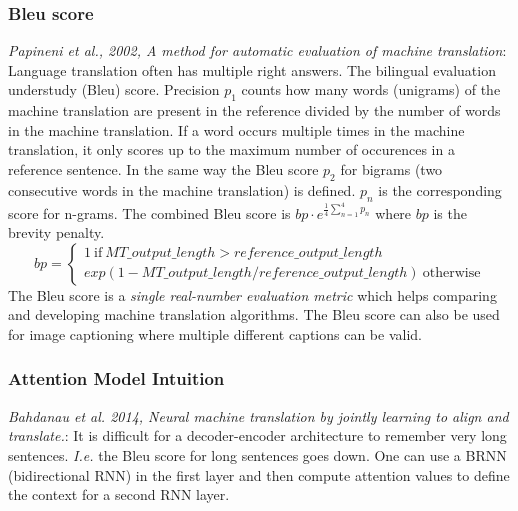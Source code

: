 \documentclass{article}
\begin{document}
\subsubsection{Bleu score}
\emph{Papineni et al., 2002, A method for automatic evaluation of machine translation}:
Language translation often has multiple right answers.
The bilingual evaluation understudy (Bleu) score.
Precision $p_1$ counts how many words (unigrams) of the machine translation are present in the reference
divided by the number of words in the machine translation.
If a word occurs multiple times in the machine translation, it only scores up to the maximum number of occurences in a reference sentence.
In the same way the Bleu score $p_2$ for bigrams (two consecutive words in the machine translation) is defined.
$p_n$ is the corresponding score for n-grams.
The combined Bleu score is $bp\cdot e^{\frac{1}{4}\sum_{n=1}^4 p_n}$
where $bp$ is the brevity penalty.
\begin{equation}
  bp=\left\{\begin{array}{l}1\ \mathrm{if}\ MT\_output\_length > reference\_output\_length\\
  exp(1-MT\_output\_length/reference\_output\_length)\ \mathrm{otherwise}\end{array}\right.
\end{equation}
The Bleu score is a \emph{single real-number evaluation metric} which helps comparing and developing machine translation algorithms.
The Bleu score can also be used for image captioning where multiple different captions can be valid.

\subsubsection{Attention Model Intuition}
\emph{Bahdanau et al. 2014, Neural machine translation by jointly learning to align and translate.}:
It is difficult for a decoder-encoder architecture to remember very long sentences.
\emph{I.e.} the Bleu score for long sentences goes down.
One can use a BRNN (bidirectional RNN) in the first layer and then compute attention values to define the context for a second RNN layer.
\end{document}
